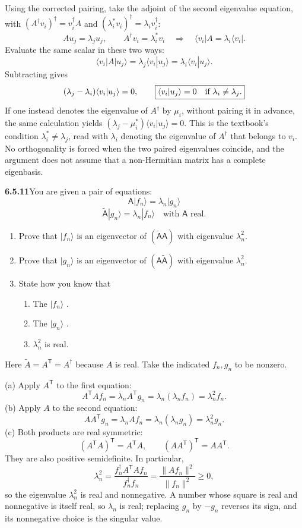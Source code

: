 Using the corrected pairing, take the adjoint of the second eigenvalue
equation, with $(A^\dagger v_i)^\dagger=v_i^\dagger A$ and
$(\lambda_i^*v_i)^\dagger=\lambda_iv_i^\dagger$:
\[
Au_j=\lambda_j u_j,\qquad
A^\dagger v_i=\lambda_i^*v_i
\quad\Longrightarrow\quad
\langle v_i|A=\lambda_i\langle v_i|.
\]
Evaluate the same scalar in these two ways:
\[
\langle v_i|A|u_j\rangle
=\lambda_j\langle v_i|u_j\rangle
=\lambda_i\langle v_i|u_j\rangle.
\]
Subtracting gives
\[
(\lambda_j-\lambda_i)\langle v_i|u_j\rangle=0,
\qquad
\boxed{\langle v_i|u_j\rangle=0\quad\hbox{if }\lambda_i\ne\lambda_j.}
\]
If one instead denotes the eigenvalue of $A^\dagger$ by $\mu_i$,
without pairing it in advance, the same calculation yields
$(\lambda_j-\mu_i^*)\langle v_i|u_j\rangle=0$.
This is the textbook's condition $\lambda_i^*\ne\lambda_j$, read with
$\lambda_i$ denoting the eigenvalue of $A^\dagger$ that belongs to
$v_i$. No orthogonality is forced when the two
paired eigenvalues coincide, and the argument does not assume that a
non-Hermitian matrix has a complete eigenbasis.

\par\bigskip
\noindent\textbf{6.5.11}\quad You are given a pair of equations:
\[
\mathsf{A}|f_{n}\rangle=\lambda_{n}|g_{n}\rangle
\]
\[
\tilde{\mathsf{A}}|g_{n}\rangle=\lambda_{n}|f_{n}\rangle
\quad\text{with }\mathsf{A}\text{ real}.
\]
\begin{enumerate}
\item[(a)] Prove that $|f_{n}\rangle$ is an eigenvector of
  $(\tilde{\mathsf{A}}\mathsf{A})$ with eigenvalue $\lambda_{n}^{2}$.
\item[(b)] Prove that $|g_{n}\rangle$ is an eigenvector of
  $(\mathsf{A}\tilde{\mathsf{A}})$ with eigenvalue $\lambda_{n}^{2}$.
\item[(c)] State how you know that
  \begin{enumerate}
  \item[(1)] The $|f_{n}\rangle$ .
  \item[(2)] The $|g_{n}\rangle$ .
  \item[(3)] $\lambda_{n}^{2}$ is real.
  \end{enumerate}
\end{enumerate}
\solution
Here $\widetilde A=A^{\mathsf T}=A^\dagger$ because $A$ is real.
Take the indicated $f_n,g_n$ to be nonzero.

(a) Apply $A^{\mathsf T}$ to the first equation:
\[
A^{\mathsf T}Af_n=\lambda_nA^{\mathsf T}g_n
=\lambda_n(\lambda_nf_n)=\boxed{\lambda_n^2f_n}.
\]
(b) Apply $A$ to the second equation:
\[
AA^{\mathsf T}g_n=\lambda_nAf_n
=\lambda_n(\lambda_ng_n)=\boxed{\lambda_n^2g_n}.
\]
(c) Both products are real symmetric:
\[
(A^{\mathsf T}A)^{\mathsf T}=A^{\mathsf T}A,
\qquad(AA^{\mathsf T})^{\mathsf T}=AA^{\mathsf T}.
\]
They are also positive semidefinite. In particular,
\[
\lambda_n^2
=\frac{f_n^\dagger A^{\mathsf T}Af_n}{f_n^\dagger f_n}
=\frac{\|Af_n\|^2}{\|f_n\|^2}\ge0,
\]
so the eigenvalue $\lambda_n^2$ is real and nonnegative. A number
whose square is real and nonnegative is itself real, so $\lambda_n$ is
real; replacing $g_n$ by $-g_n$ reverses its sign, and its nonnegative
choice is the singular value.

